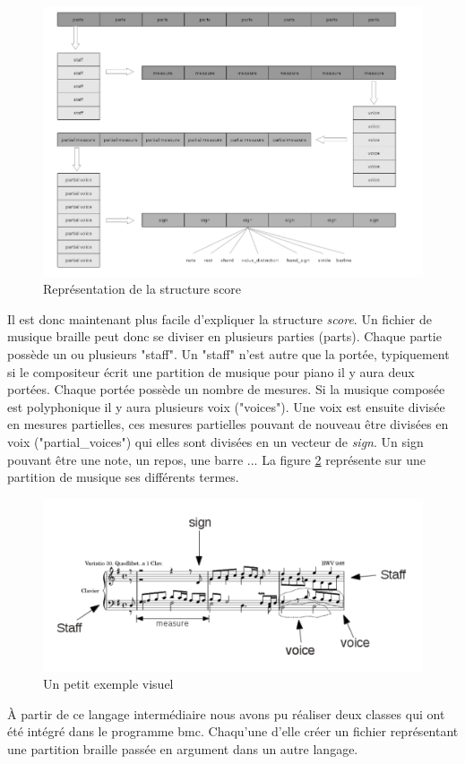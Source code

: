 \begin{figure}[h]
  \centering
  \includegraphics[width=1\textwidth]{images/bmc-score.png}
  \caption{Représentation de la structure score}
  \label{score}
\end{figure}

Il est donc maintenant plus facile d'expliquer la structure
\textit{score}. Un fichier de musique braille peut donc se diviser en
plusieurs parties (parts). Chaque partie possède un ou plusieurs
"staff". Un "staff" n'est autre que la portée, typiquement si le
compositeur écrit une partition de musique pour piano il y aura deux
portées. Chaque portée possède un nombre de mesures. Si la musique
composée est polyphonique il y aura plusieurs voix ("voices"). Une
voix est ensuite divisée en mesures partielles, ces mesures partielles
pouvant de nouveau être divisées en voix ("partial\_voices") qui elles
sont divisées en un vecteur de \textit{sign}. Un sign pouvant être une
note, un repos, une barre ... La figure \ref{musicexe} représente sur
une partition de musique ses différents termes.


\begin{figure}[!h]
  \includegraphics[width=1\textwidth]{images/score-visu.png}
  \caption{Un petit exemple visuel}
  \label{musicexe}
\end{figure}

À partir de ce langage intermédiaire nous avons pu réaliser deux
classes qui ont été intégré dans le programme bmc. Chaqu'une d'elle
créer un fichier représentant une partition braille passée en argument
dans un autre langage.


